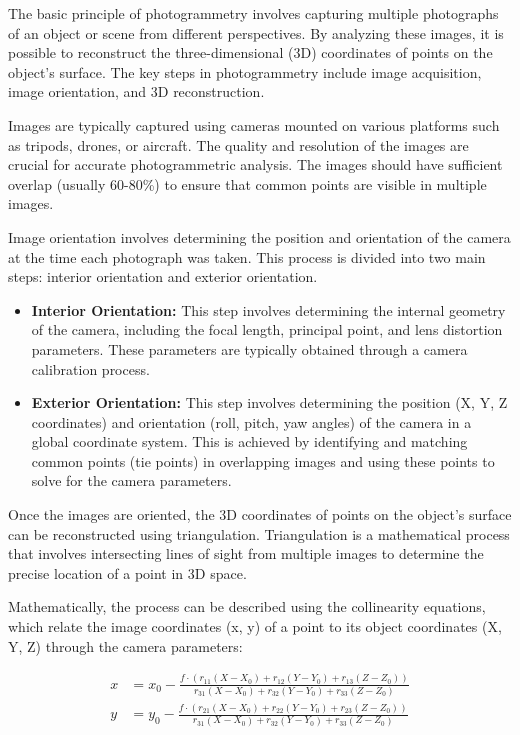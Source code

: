 \documentclass[12pt,a4paper,oneside]{report}
\begin{document}
The basic principle of photogrammetry involves capturing multiple photographs of 
an object or scene from different perspectives. By analyzing these images, it is 
possible to reconstruct the three-dimensional (3D) coordinates of points on the 
object's surface. The key steps in photogrammetry include image acquisition, image 
orientation, and 3D reconstruction.

Images are typically captured using cameras mounted on various platforms such as 
tripods, drones, or aircraft. The quality and resolution of the images are crucial 
for accurate photogrammetric analysis. The images should have sufficient overlap 
(usually 60-80\%) to ensure that common points are visible in multiple images.

Image orientation involves determining the position and orientation of the camera 
at the time each photograph was taken. This process is divided into two main steps: 
interior orientation and exterior orientation.

\begin{itemize}
    \item \textbf{Interior Orientation:} This step involves determining the internal 
    geometry of the camera, including the focal length, principal point, and lens 
    distortion parameters. These parameters are typically obtained through a camera 
    calibration process.
    \item \textbf{Exterior Orientation:} This step involves determining the position 
    (X, Y, Z coordinates) and orientation (roll, pitch, yaw angles) of the camera 
    in a global coordinate system. This is achieved by identifying and matching 
    common points (tie points) in overlapping images and using these points to solve 
    for the camera parameters.
\end{itemize}

Once the images are oriented, the 3D coordinates of points on the object's surface 
can be reconstructed using triangulation. Triangulation is a mathematical process 
that involves intersecting lines of sight from multiple images to determine the 
precise location of a point in 3D space.

Mathematically, the process can be described using the collinearity equations, which 
relate the image coordinates (x, y) of a point to its object coordinates (X, Y, Z) 
through the camera parameters:

\[
\begin{aligned}
    x &= x_0 - \frac{f \cdot (r_{11}(X - X_0) + r_{12}(Y - Y_0) + r_{13}(Z - Z_0))}{r_{31}(X - X_0) + r_{32}(Y - Y_0) + r_{33}(Z - Z_0)} \\
    y &= y_0 - \frac{f \cdot (r_{21}(X - X_0) + r_{22}(Y - Y_0) + r_{23}(Z - Z_0))}{r_{31}(X - X_0) + r_{32}(Y - Y_0) + r_{33}(Z - Z_0)}
\end{aligned}
\]
\end{document}
